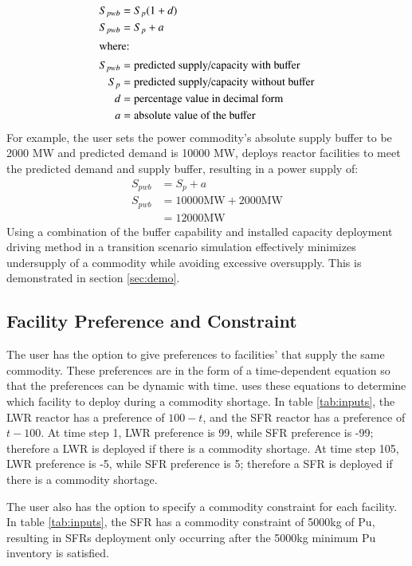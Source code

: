 \begin{align}
    \label{eq:perc}
	S_{pwb} &= S_{p}(1+d)\\
	\label{eq:abs}
	S_{pwb} &= S_{p}+a \\
	\intertext{where:}
	S_{pwb} &= \mbox{predicted supply/capacity with buffer} \nonumber\\
	S_p &= \mbox{predicted supply/capacity without buffer} \nonumber\\
	d &= \mbox{percentage value in decimal form} \nonumber\\
    a &= \mbox{absolute value of the buffer} \nonumber
\end{align}
For example, the user sets the power commodity's absolute supply buffer 
to be 2000 MW and predicted demand is 10000 MW, \deploy deploys reactor 
facilities to meet the predicted demand and supply buffer, resulting 
in a power supply of: 
\begin{align*}
	S_{pwb} &= S_{p}+a \\
	S_{pwb} &= 10000 \mbox{MW}+2000 \mbox{MW} \\
	&= 12000\mbox{MW}
\end{align*}
Using a combination of the buffer capability and  
installed capacity deployment driving method in a transition 
scenario simulation effectively minimizes undersupply of a 
commodity while avoiding excessive oversupply. 
This is demonstrated in section \ref{sec:demo}. 

\subsection{Facility Preference and Constraint}
\label{sec:constrain}
The user has the option to give preferences to facilities' 
that supply the same commodity. 
These preferences are in the form of a time-dependent 
equation so that the preferences can be dynamic with time. 
\deploy uses these equations to determine which facility 
to deploy during a commodity shortage.  
In table \ref{tab:inputs}, 
the \gls{LWR} reactor has a preference of $100-t$, and the 
\gls{SFR} reactor has a preference of $t-100$. 
At time step 1, LWR preference is 99, while SFR preference is -99; 
therefore a LWR is deployed if there is a commodity shortage. 
At time step 105, LWR preference is -5, while SFR preference is 5; 
therefore a SFR is deployed if there is a commodity shortage. 

The user also has the option to specify a commodity constraint for
each facility.  
In table \ref{tab:inputs}, 
the \gls{SFR} has a commodity constraint of 5000kg of Pu, 
resulting in \glspl{SFR} deployment only occurring after the 5000kg 
minimum Pu inventory is satisfied.

